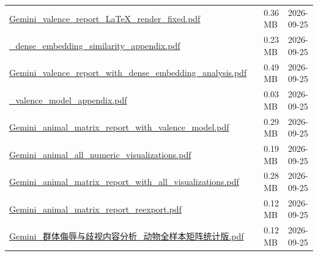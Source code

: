 \documentclass[UTF8,fontset=fandol,10pt,a4paper]{ctexart}
\begin{document}
\begin{longtable}{@{}L{\dimexpr\linewidth-50mm-6\tabcolsep\relax}R{8mm}R{16mm}R{26mm}@{}}
\href{https://chatgpt.com/library?file_id=libfile_6cd221b52d8c8191b0f8b8612d245db5&account_id=personal}{Gemini\_\allowbreak{}valence\_\allowbreak{}report\_\allowbreak{}LaTeX\_\allowbreak{}render\_\allowbreak{}fixed.\allowbreak{}pdf} & \textemdash{} & 0.36 MB & 2026-09-25 \\
\href{https://chatgpt.com/library?file_id=libfile_000468a2bab881919ae5077682c5c27c&account_id=personal}{\_\allowbreak{}dense\_\allowbreak{}embedding\_\allowbreak{}similarity\_\allowbreak{}appendix.\allowbreak{}pdf} & \textemdash{} & 0.23 MB & 2026-09-25 \\
\href{https://chatgpt.com/library?file_id=libfile_b259229d29908191a5ac1465f86df3f7&account_id=personal}{Gemini\_\allowbreak{}valence\_\allowbreak{}report\_\allowbreak{}with\_\allowbreak{}dense\_\allowbreak{}embedding\_\allowbreak{}analysis.\allowbreak{}pdf} & \textemdash{} & 0.49 MB & 2026-09-25 \\
\href{https://chatgpt.com/library?file_id=libfile_838959d537908191b28c4cea340c3f3c&account_id=personal}{\_\allowbreak{}valence\_\allowbreak{}model\_\allowbreak{}appendix.\allowbreak{}pdf} & \textemdash{} & 0.03 MB & 2026-09-25 \\
\href{https://chatgpt.com/library?file_id=libfile_cd024a9e71e8819189e3216374bb4df9&account_id=personal}{Gemini\_\allowbreak{}animal\_\allowbreak{}matrix\_\allowbreak{}report\_\allowbreak{}with\_\allowbreak{}valence\_\allowbreak{}model.\allowbreak{}pdf} & \textemdash{} & 0.29 MB & 2026-09-25 \\
\href{https://chatgpt.com/library?file_id=libfile_bfb9947bc3208191b79c84012361b1db&account_id=personal}{Gemini\_\allowbreak{}animal\_\allowbreak{}all\_\allowbreak{}numeric\_\allowbreak{}visualizations.\allowbreak{}pdf} & \textemdash{} & 0.19 MB & 2026-09-25 \\
\href{https://chatgpt.com/library?file_id=libfile_c404cc1ab94c8191a544c669a6e0d227&account_id=personal}{Gemini\_\allowbreak{}animal\_\allowbreak{}matrix\_\allowbreak{}report\_\allowbreak{}with\_\allowbreak{}all\_\allowbreak{}visualizations.\allowbreak{}pdf} & \textemdash{} & 0.28 MB & 2026-09-25 \\
\href{https://chatgpt.com/library?file_id=libfile_0beb53b72a8c8191a37a0b94bffabe43&account_id=personal}{Gemini\_\allowbreak{}animal\_\allowbreak{}matrix\_\allowbreak{}report\_\allowbreak{}reexport.\allowbreak{}pdf} & \textemdash{} & 0.12 MB & 2026-09-25 \\
\href{https://chatgpt.com/library?file_id=libfile_8b4a108746d881919aee15212462ff03&account_id=personal}{Gemini\_\allowbreak{}群体侮辱与歧视内容分析\_\allowbreak{}动物全样本矩阵统计版.\allowbreak{}pdf} & \textemdash{} & 0.12 MB & 2026-09-25 \\

\end{longtable}
\end{document}
